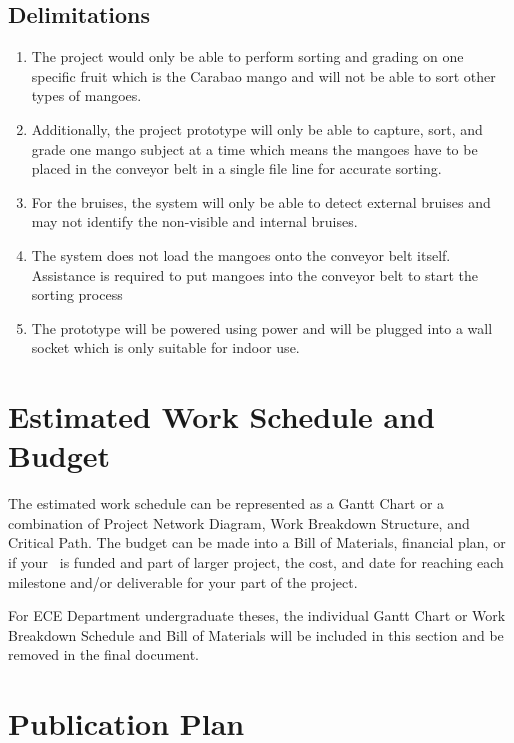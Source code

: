 \subsection{Delimitations}
\begin{enumerate}
	\item The project would only be able to perform sorting and grading on one specific fruit 
	which is the Carabao mango and will not be able to sort other types of mangoes.
	
	\item Additionally, the project prototype will only be able to capture, sort, and grade one 
	mango subject at a time which means the mangoes have to be placed in the conveyor belt in
	 a single file line for accurate sorting. 
	
	\item For the bruises, the system will only be able to detect external bruises and 
	may not identify the non-visible and internal bruises.
	\item The system does not load the mangoes onto the conveyor belt itself. 
	Assistance is required to put mangoes into the conveyor belt to start the sorting process
	\item The prototype will be powered using  power and will be plugged into 
	a wall socket which is only suitable for indoor use.
\end{enumerate}



\ifFinished
\else

\section{Estimated Work Schedule and Budget}

The estimated work schedule can be represented as a Gantt Chart or a combination of Project Network Diagram, Work Breakdown Structure, and Critical Path.  The budget can be made into a Bill of Materials, financial plan, or if your \documentType \ is funded and part of larger project, the cost, and date for reaching each milestone and/or deliverable for your part of the project.

For ECE Department undergraduate theses, the individual Gantt Chart or Work Breakdown Schedule and Bill of Materials will be included in this section and be removed in the final document.

\graytx{\blindtext}

\ifPhD
\section{Publication Plan}
\graytx{\blindtext}
\fi

